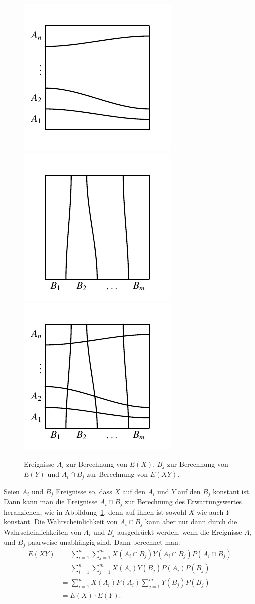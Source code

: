 \begin{figure}
\begin{center}
\includegraphics[width=0.3\hsize]{images/erwartung-4}
\includegraphics[width=0.3\hsize]{images/erwartung-3}
\includegraphics[width=0.3\hsize]{images/erwartung-2}
\end{center}
\caption{Ereignisse $A_i$ zur Berechnung von $E(X)$, $B_j$ zur Berechnung
von $E(Y)$ und $A_i\cap B_j$ zur Berechnung von $E(XY)$.
\label{productexpectation}}
\end{figure}
Seien $A_i$ und $B_j$ Ereignisse so, dass $X$ auf den $A_i$ und $Y$ auf
den $B_j$ konstant ist.
Dann kann man die Ereignisse $A_i\cap B_j$
zur Berechnung des Erwartungswertes heranziehen, wie in
Abbildung~\ref{productexpectation}, denn auf ihnen ist sowohl $X$ wie
auch $Y$ konstant.
Die Wahrscheinlichkeit von $A_i\cap B_j$ kann aber nur dann
durch die Wahrscheinlichkeiten von $A_i$ und $B_j$ ausgedrückt werden,
wenn die Ereignisse $A_i$ und $B_j$ paarweise
unabhängig sind.
Dann berechnet man:
\begin{align*}
E(XY)&=\sum_{i=1}^n\sum_{j=1}^m X(A_i\cap B_j)Y(A_i\cap B_j)P(A_i\cap B_j)\\
&=\sum_{i=1}^n\sum_{j=1}^m X(A_i)Y(B_j)P(A_i)P(B_j)\\
&=\sum_{i=1}^n X(A_i)P(A_i)\sum_{j=1}^mY(B_j)P(B_j)\\
&=E(X)\cdot E(Y).
\end{align*}

